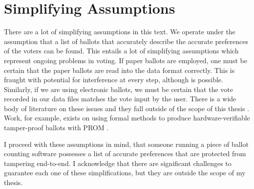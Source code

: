 \section{Simplifying Assumptions}

There are a lot of simplifying assumptions in this text. We operate under the
assumption that a list of ballots that accurately describe the accurate
preferences of the voters can be found. This entails a lot of simplifying
assumptions which represent ongoing problems in voting. If paper ballots are
employed, one must be certain that the paper ballots are read into the data
format correctly. This is fraught with potential for interference at every step,
although is possible. Similarly, if we are using electronic ballots, we must be
certain that the vote recorded in our data files matches the vote input by the
user. There is a wide body of literature on these issues and they fall outside
of the scope of this thesis \cite{election_safety}. Work, for example, exists on
using formal methods to produce hardware-verifiable tamper-proof ballots with
PROM \cite{prom1,prom2}. 

I proceed with these assumptions in mind, that someone running a piece of ballot
counting software possesses a list of accurate preferences that are protected from
tampering end-to-end. I acknowledge that there are significant challenges to
guarantee each one of these simplifications, but they are outside the scope of
my thesis. 